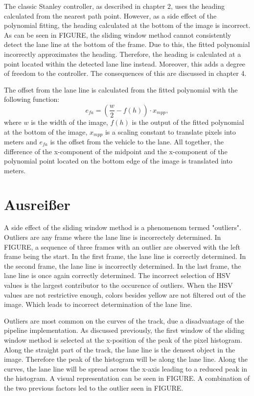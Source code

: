 \documentclass[arbeit=studie,oneside,BCOR=12mm]{ArbeitRST}
\begin{document}
The classic Stanley controller, as described in chapter 2, uses the heading
calculated from the nearest path point. However, as a side effect of the
polynomial fitting, the heading calculated at the bottom of the image is
incorrect. As can be seen in FIGURE, the sliding window method cannot consistently
detect the lane line at the bottom of the frame. Due to this, the
fitted polynomial incorrectly approximates the heading. Therefore, the heading
is calculated at a point located within the detected lane line instead.
Moreover, this adds a degree of freedom to the controller. The consequences of
this are discussed in chapter 4.

The offset from the lane line is calculated from the fitted polynomial with
the following function: $$e_{fa} = (\frac{w}{2} - f(h))\cdot x_{mpp},$$ where
$w$ is the width of the image, $f(h)$ is the output of the fitted polynomial
at the bottom of the image, $x_{mpp}$ is a scaling constant to translate
pixels into meters and $e_{fa}$ is the offset from the vehicle to the lane.
All together, the difference of the x-component of the midpoint and the
x-component of the polynomial point located on the bottom edge of the image is
translated into meters.

\section{Ausrei{\ss}er}

\iffalse

A side effect of the sliding window method is a phenomenom termed "outliers".
Outliers are any frame where the lane line is incorrectely determined. In
FIGURE, a sequence of three frames with an outlier are observed with the left
frame being the start. In the first frame, the lane line is correctly
determined. In the second frame, the lane line is incorrectly determined. In
the last frame, the lane line is once again correctly determined. The incorrect
selection of HSV values is the largest contributor to the occurence of
outliers. When the HSV values are not restrictive enough, colors besides yellow
are not filtered out of the image. Which leads to incorrect determination of
the lane line.

Outliers are most common on the curves of the track, due a disadvantage of the
pipeline implementation. As discussed previously, the first window of the
sliding window method is selected at the x-position of the peak of the pixel
histogram. Along the straight part of the track, the lane line is the densest
object in the image. Therefore the peak of the histogram will be along the lane
line. Along the curves, the lane line will be spread across the x-axis leading
to a reduced peak in the histogram. A visual representation can be seen in
FIGURE. A combination of the two previous factors led to the outlier seen in
FIGURE.
\end{document}
